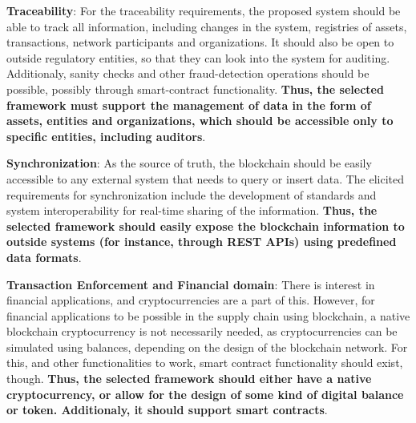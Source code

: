 \par \textbf{Traceability}: For the traceability requirements, the proposed system should be able to track all information, including changes in the system, registries of assets, transactions, network participants and organizations. It should also be open to outside regulatory entities, so that they can look into the system for auditing. Additionaly, sanity checks and other fraud-detection operations should be possible, possibly through smart-contract functionality. \textbf{Thus, the selected framework must support the management of data in the form of assets, entities and organizations, which should be accessible only to specific entities, including auditors}.

\par \textbf{Synchronization}: As the source of truth, the blockchain should be easily accessible to any external system that needs to query or insert data. The elicited requirements for synchronization include the development of standards and system interoperability for real-time sharing of the information. \textbf{Thus, the selected framework should easily expose the blockchain information to outside systems (for instance, through REST APIs) using predefined data formats}.

\par \textbf{Transaction Enforcement and Financial domain}: There is interest in financial applications, and cryptocurrencies are a part of this. However, for financial applications to be possible in the supply chain using blockchain, a native blockchain cryptocurrency is not necessarily needed, as cryptocurrencies can be simulated using balances, depending on the design of the blockchain network. For this, and other functionalities to work, smart contract functionality should exist, though. \textbf{Thus, the selected framework should either have a native cryptocurrency, or allow for the design of some kind of digital balance or token. Additionaly, it should support smart contracts}.


